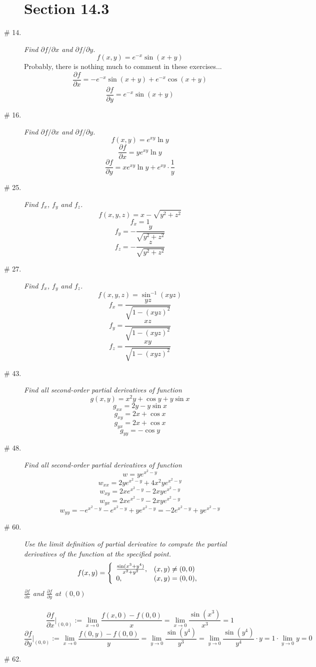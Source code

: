 \documentclass[8pt]{article} %
\begin{document}
\begin{description}
\section{Section 14.3}
	\item[\# 14.]{{\it Find $\partial f/\partial x$ and $\partial f/\partial y$.
		\[f(x,y)=e^{-x}\sin(x+y)\]}
		Probably, there is nothing much to comment in these exercises...
		\[\frac{\partial f}{\partial x}=-e^{-x}\sin(x+y)+e^{-x}\cos(x+y)\]
		\[\frac{\partial f}{\partial y}=e^{-x}\sin(x+y)\]
		}
	\item[\# 16.]{{\it Find $\partial f/\partial x$ and $\partial f/\partial y$.}
		\[f(x,y)=e^{xy}\ln y\]
		\[\frac{\partial f}{\partial x}=ye^{xy}\ln y\]
		\[\frac{\partial f}{\partial y}=xe^{xy}\ln y+e^{xy}\cdot\frac{1}{y}\]
		}
	\item[\# 25.]{{\it Find $f_x$, $f_y$ and $f_z$.}
		\[f(x,y,z)=x-\sqrt{y^2+z^2}\]
		\[f_x=1\]
		\[f_y=-\frac{y}{\sqrt{y^2+z^2}}\]
		\[f_z=-\frac{z}{\sqrt{y^2+z^2}}\]
		}
	\item[\# 27.]{{\it Find $f_x$, $f_y$ and $f_z$.}
		\[f(x,y,z)=\sin^{-1}(xyz)\]
		\[f_x=\frac{yz}{\sqrt{1-(xyz)^2}}\]
		\[f_y=\frac{xz}{\sqrt{1-(xyz)^2}}\]
		\[f_z=\frac{xy}{\sqrt{1-(xyz)^2}}\]
		}
	\item[\# 43.]{{\it Find all second-order partial derivatives of function \[g(x,y)=x^2y+\cos y+y\sin x\]}
		\[g_{xx}=2y-y\sin x\]
		\[g_{xy}=2x+\cos x\]
		\[g_{yx}=2x+\cos x\]
		\[g_{yy}=-\cos y\]
		}
	\item[\# 48.]{{\it Find all second-order partial derivatives of function \[w=ye^{x^2-y}\]}
		\[w_{xx}=2ye^{x^2-y}+4x^2ye^{x^2-y}\]
		\[w_{xy}=2xe^{x^2-y}-2xye^{x^2-y}\]
		\[w_{yx}=2xe^{x^2-y}-2xye^{x^2-y}\]
		\[w_{yy}=-e^{x^2-y}-e^{x^2-y}+ye^{x^2-y}=-2e^{x^2-y}+ye^{x^2-y}\]
		}
	\item[\# 60.]{{\it Use the limit definition of partial derivative to compute the partial derivatives of the function
		at the specified point.}
		\[f(x,y)=\left\{\begin{array}{ll}\frac{\sin(x^3+y^4)}{x^2+y^2}, &(x,y)\neq(0,0)\\
			0, &(x,y)=(0,0),
		\end{array}\right.\\
		\]
		{\it $\frac{\partial f}{\partial x}$ and $\frac{\partial f}{\partial y}$ at $(0,0)$}\\\\
		\[\frac{\partial f}{\partial x}\bigg|_{(0,0)}:=\lim_{x\to 0}\frac{f(x,0)-f(0,0)}{x}=\lim_{x\to 0}\frac{\sin(x^3)}
		{x^3}=1\]
		\[\frac{\partial f}{\partial y}\bigg|_{(0,0)}:=\lim_{x\to 0}\frac{f(0,y)-f(0,0)}{y}=\lim_{y\to 0}\frac{\sin(y^4)}
		{y^3}=\lim_{y\to0}\frac{\sin(y^4)}{y^4}\cdot y=1\cdot\lim_{y\to 0}y=0\]
		}
	\item[\# 62.]{{\it }
		}
\end{description}
\end{document}
